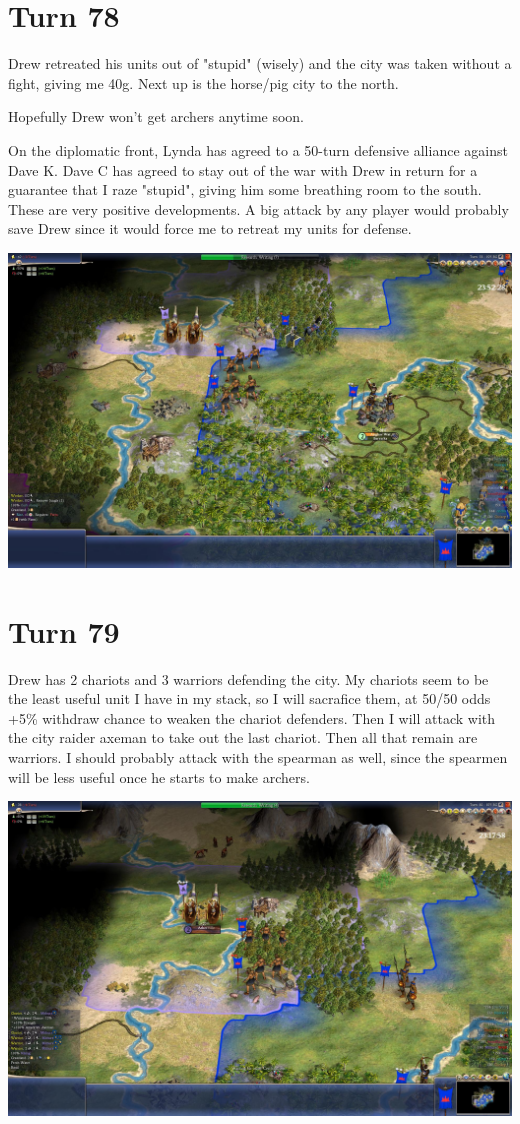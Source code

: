 \documentclass[10pt]{article}
\begin{document}
\section*{Turn 78}

Drew retreated his units out of "stupid" (wisely) and the city was
taken without a fight, giving me 40g. Next up is the horse/pig city to
the north.

Hopefully Drew won't get archers anytime soon.

On the diplomatic front, Lynda has agreed to a 50-turn defensive
alliance against Dave K. Dave C has agreed to stay out of the war with
Drew in return for a guarantee that I raze "stupid", giving him some
breathing room to the south. These are very positive developments. A
big attack by any player would probably save Drew since it would force
me to retreat my units for defense.

\includegraphics[width=1.0\textwidth]{turn78}

\section*{Turn 79}

Drew has 2 chariots and 3 warriors defending the city. My chariots
seem to be the least useful unit I have in my stack, so I will
sacrafice them, at 50/50 odds +5\% withdraw chance to weaken the
chariot defenders. Then I will attack with the city raider axeman to
take out the last chariot. Then all that remain are warriors. I should
probably attack with the spearman as well, since the spearmen will be
less useful once he starts to make archers.

\includegraphics[width=1.0\textwidth]{turn79}
\end{document}
